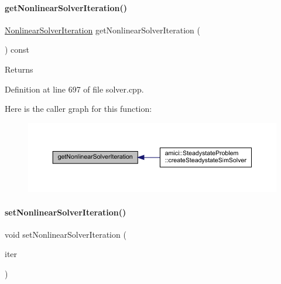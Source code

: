 \paragraph{\texorpdfstring{get\+Nonlinear\+Solver\+Iteration()}{getNonlinearSolverIteration()}}
{\footnotesize\ttfamily \mbox{\hyperlink{namespaceamici_a13388d34e4c35bb592c3e821c35cc923}{Nonlinear\+Solver\+Iteration}} get\+Nonlinear\+Solver\+Iteration (\begin{DoxyParamCaption}{ }\end{DoxyParamCaption}) const}

\begin{DoxyReturn}{Returns}

\end{DoxyReturn}


Definition at line 697 of file solver.\+cpp.

Here is the caller graph for this function\+:
\nopagebreak
\begin{figure}[H]
\begin{center}
\leavevmode
\includegraphics[width=350pt]{classamici_1_1_solver_a33883905a8ab056896373d76f18ce683_icgraph}
\end{center}
\end{figure}
\mbox{\label{classamici_1_1_solver_a1dc7983f545ee95f7e6fb38cfb0b3286}} 
\paragraph{\texorpdfstring{set\+Nonlinear\+Solver\+Iteration()}{setNonlinearSolverIteration()}}
{\footnotesize\ttfamily void set\+Nonlinear\+Solver\+Iteration (\begin{DoxyParamCaption}\item[{\mbox{\hyperlink{namespaceamici_a13388d34e4c35bb592c3e821c35cc923}{Nonlinear\+Solver\+Iteration}}}]{iter }\end{DoxyParamCaption})}


